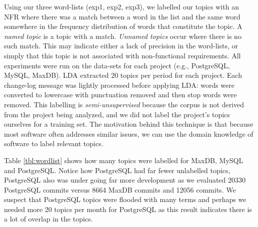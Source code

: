 \documentclass[smallextended]{svjour3}       %
\begin{document}
Using our three word-lists (\textsf{exp1}, \textsf{exp2}, \textsf{exp3}), we labelled our topics with an NFR where there was a match between a word in
the list and the same word somewhere in the frequency distribution of words that constitute the topic.
A \emph{named topic} is a topic with a match. 
\emph{Unnamed topics} occur where there is no such match. 
This may indicate either a lack of precision in the word-lists, or simply that this topic is not associated with non-functional
requirements.
All experiments were run on the data-sets for each project (e.g., PostgreSQL, MySQL, MaxDB). LDA
extracted $20$ topics per period for each project.
Each change-log message was lightly processed before applying LDA:
words were converted to lowercase with punctuation removed and then
stop words were removed.
This labelling is \emph{semi-unsupervised} because the corpus is not derived from 
the project being analyzed, and we did not label the project's topics
ourselves for a training set. The motivation behind this technique is that
because most software often addresses similar issues, we can use the 
domain knowledge of software to label relevant topics.


Table \ref{tbl:wordlist} shows how many topics were labelled for
MaxDB, MySQL and PostgreSQL.  Notice how PostgreSQL had far fewer
unlabelled topics, PostgreSQL also was under going far more
development as we evaluated 20330 PostgreSQL commits versus 8664 MaxDB
commits and 12056 commits. We suspect that PostgreSQL topics were
flooded with many terms and perhaps we needed more 20 topics per month
for PostgreSQL as this result indicates there is a lot of overlap in
the topics.
\end{document}
